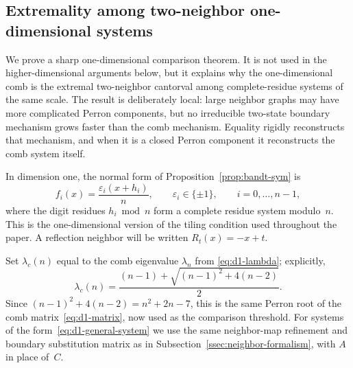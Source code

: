 \documentclass{amsart}
\theoremstyle{definition}
\theoremstyle{remark}
\begin{document}
\subsection{Extremality among two-neighbor one-dimensional systems}
\label{ssec:d1-two-neighbor-extremal}

We prove a sharp one-dimensional comparison theorem.  It is not used
in the higher-dimensional arguments below, but it explains why the
one-dimensional comb is the extremal two-neighbor cantorval among
complete-residue systems of the same scale.
The result is deliberately local: large neighbor graphs may have more
complicated Perron components, but no irreducible two-state boundary
mechanism grows faster than the comb mechanism.  Equality rigidly
reconstructs that mechanism, and when it is a closed Perron component it
reconstructs the comb system itself.

In dimension one, the normal form of Proposition~\ref{prop:bandt-sym}
is
\begin{equation}\label{eq:d1-general-system}
  f_i(x) = \frac{\varepsilon_i(x+h_i)}{n},
  \qquad \varepsilon_i \in \{\pm 1\},
  \qquad i=0,\ldots,n-1,
\end{equation}
where the digit residues \(h_i \bmod n\) form a complete residue
system modulo~$n$.  This is the one-dimensional version of the tiling
condition used throughout the paper.  A reflection neighbor will be written
\(R_t(x)=-x+t\).

Set $\lambda_c(n)$ equal to the comb eigenvalue $\lambda_n$ from
\eqref{eq:d1-lambda}; explicitly,
\begin{equation}\label{eq:lambdac}
  \lambda_c(n)
  = \frac{(n-1)+\sqrt{(n-1)^2+4(n-2)}}{2}.
\end{equation}
Since $(n-1)^2+4(n-2)=n^2+2n-7$, this is the same Perron root of the
comb matrix~\eqref{eq:d1-matrix}, now used as the comparison threshold.
For systems of the form~\eqref{eq:d1-general-system} we use the same
neighbor-map refinement and boundary substitution matrix as in
Subsection~\ref{ssec:neighbor-formalism}, with \(A\) in place of~\(C\).
\end{document}
